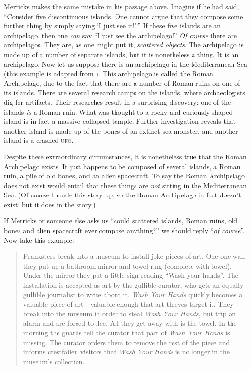 \documentclass[12pt,twoside]{reedfancy}
\begin{document}
\begin{spacing}{1.25}
Merricks makes the same mistake in his passage above.  Imagine if he
had said, ``Consider five discontinuous islands.  One cannot argue
that they compose some further thing by simply saying `I just see
it!'\,'' If these five islands are an archipelago, then one {\em can}
say ``I just see the archipelago!''  {\em Of course} there are
archipelagos.  They are, as one might put it, {\em scattered objects}.
The archipelago is made up of a number of separate islands, but it is
nonetheless a thing.  It is an archipelago.  Now let us suppose there
is an archipelago in the Mediterranean Sea (this example is adapted
from \citet{hawthorne2008}).  This archipelago is called the Roman
Archipelago, due to the fact that there are a number of Roman ruins on
one of its islands.  There are several research camps on the islands,
where archaeologists dig for artifacts.  Their researches result in a
surprising discovery: one of the islands {\em is} a Roman ruin.  What
was thought to a rocky and curiously shaped island is in fact a
massive collapsed temple.  Further investigation reveals that another
island is made up of the bones of an extinct sea monster, and another
island is a crashed \textsc{ufo}.

Despite these extraordinary circumstances, it is nonetheless true that
the Roman Archipelago exists.  It just happens to be composed of
several islands, a Roman ruin, a pile of old bones, and an alien
spacecraft.  To say the Roman Archipelago does not exist would entail
that these things are {\em not} sitting in the Mediterranean Sea.  (Of
course I made this story up, so the Roman Archipelago in fact doesn't
exist; but it does in the story.)

If Merricks or someone else asks us ``could scattered islands, Roman
ruins, old bones and alien spacecraft ever compose anything?'' we
should reply ``{\em of course}''.  Now take this example:

\begin{quote}
Pranksters break into a museum to install joke pieces of art.  One one
wall they put up a bathroom mirror and towel ring (complete with
towel).  Under the mirror they put a little sign reading ``Wash your
hands''.  The installation is accepted as art by the gullible curator,
who gets an equally gullible journalist to write about it.  {\em Wash
  Your Hands} quickly becomes a valuable piece of art---valuable
enough that art thieves target it.  They break into the museum in
order to steal {\em Wash Your Hands}, but trip an alarm and are forced
to flee.  All they get away with is the towel.  In the morning the
guards tell the curator that part of {\em Wash Your Hands} is missing.
The curator orders them to remove the rest of the piece and informs
crestfallen visitors that {\em Wash Your Hands} is no longer in the
museum's collection.
\end{quote}


\end{spacing}
\end{document}
